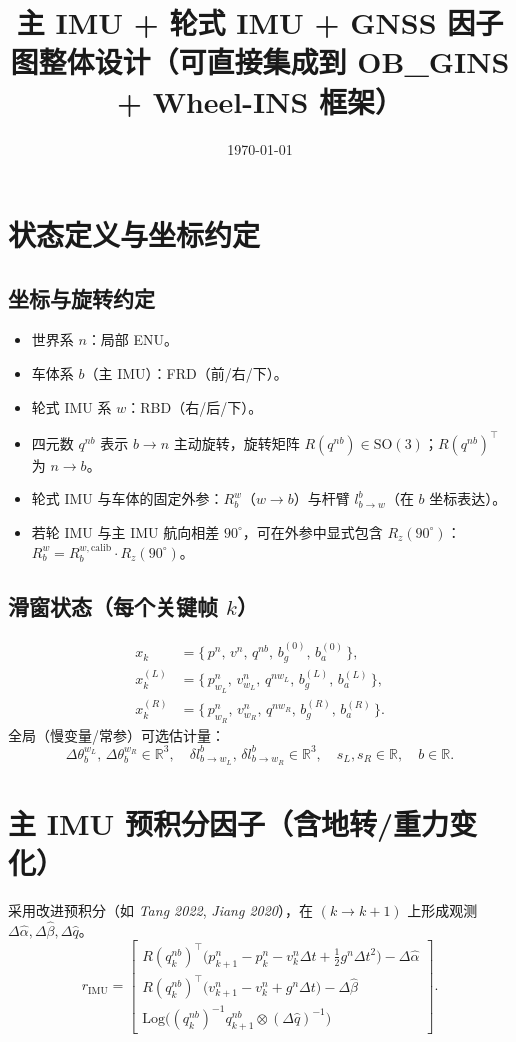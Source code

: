 \documentclass[11pt]{article}
\title{主 IMU + 轮式 IMU + GNSS 因子图整体设计（可直接集成到 OB\_GINS + Wheel-INS 框架）}
\author{ }
\date{\today}
\newcommand{\Log}{\mathrm{Log}}          %
\newcommand{\SO}{\mathrm{SO}(3)}
\newcommand{\R}{\mathbb{R}}
\newcommand{\ang}[1]{#1^{\circ}}
\begin{document}
\maketitle

\section{状态定义与坐标约定}
\subsection*{坐标与旋转约定}
\begin{itemize}
  \item 世界系 $n$：局部 ENU。
  \item 车体系 $b$（主 IMU）：FRD（前/右/下）。
  \item 轮式 IMU 系 $w$：RBD（右/后/下）。
  \item 四元数 $q^{nb}$ 表示 $b\to n$ 主动旋转，旋转矩阵 $R(q^{nb})\in\SO$；$R(q^{nb})^\top$ 为 $n\to b$。
  \item 轮式 IMU 与车体的固定外参：$R_b^{w}$（$w\to b$）与杆臂 $l_{b\to w}^b$（在 $b$ 坐标表达）。
  \item 若轮 IMU 与主 IMU 航向相差 $\ang{90}$，可在外参中显式包含 $R_z(\ang{90})$：$R_b^{w} = R_b^{w,\text{calib}}\cdot R_z(\ang{90})$。
\end{itemize}

\subsection*{滑窗状态（每个关键帧 $k$）}
\begin{align*}
x_k &= \{\,p^n,\, v^n,\, q^{nb},\, b_g^{(0)},\, b_a^{(0)}\,\},\\
x_k^{(L)} &= \{\,p_{w_L}^n,\, v_{w_L}^n,\, q^{nw_L},\, b_g^{(L)},\, b_a^{(L)}\,\},\\
x_k^{(R)} &= \{\,p_{w_R}^n,\, v_{w_R}^n,\, q^{nw_R},\, b_g^{(R)},\, b_a^{(R)}\,\}.
\end{align*}
全局（慢变量/常参）可选估计量：
\[
\Delta \theta_b^{w_L},\, \Delta \theta_b^{w_R}\in\R^3,\quad
\delta l_{b\to w_L}^b,\, \delta l_{b\to w_R}^b\in\R^3,\quad
s_L, s_R\in\R,\quad b\in\R.
\]

\section{主 IMU 预积分因子（含地转/重力变化）}
采用改进预积分（如 \textit{Tang 2022}, \textit{Jiang 2020}），在 $(k\to k+1)$ 上形成观测 $\Delta\hat{\alpha},\Delta\hat{\beta},\Delta\hat{q}$。
\begin{equation}
r_{\mathrm{IMU}}=
\begin{bmatrix}
R(q_k^{nb})^\top\!\big(p_{k+1}^n - p_k^n - v_k^n \Delta t + \tfrac{1}{2} g^n \Delta t^2\big) - \Delta\hat{\alpha}\\[2pt]
R(q_k^{nb})^\top\!\big(v_{k+1}^n - v_k^n + g^n \Delta t\big) - \Delta\hat{\beta}\\[2pt]
\Log\!\big( (q_k^{nb})^{-1} q_{k+1}^{nb} \otimes (\Delta\hat{q})^{-1} \big)
\end{bmatrix}.
\end{equation}
\end{document}
